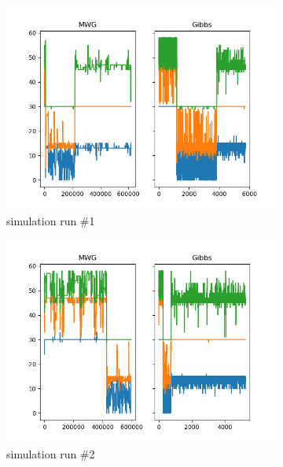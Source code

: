 \begin{figure}[H]
    \centering
    \begin{subfigure}{.3\textwidth}
    	\centering
        \includegraphics[width=\linewidth]{../../plots/Trace_M4_N60_NMCMC3_seed0_diffind2.png}
        \caption{simulation run \#1}
    \end{subfigure}
    \begin{subfigure}{.3\textwidth}
        \centering
    	\includegraphics[width=\linewidth]{../../plots/Trace_M4_N60_NMCMC3_seed1_diffind2.png}
    	\caption{simulation run \#2}
	\end{subfigure}
	\begin{subfigure}{.3\textwidth}
	    \centering

\end{subfigure}
\end{figure}
